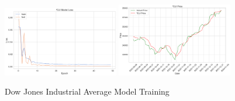 \documentclass{ledger}
\begin{document}
\begin{figure}[htbp]
    \centering
    \includegraphics[width=0.45\textwidth]{code/price-prediction/lstm/images/^dji_loss.png} %
    \hspace{0.05\textwidth} %
    \includegraphics[width=0.45\textwidth]{code/price-prediction/lstm/images/^dji_price.png} %
    \caption{Dow Jones Industrial Average Model Training}
    \label{fig:side_by_side}
\end{figure}

\thispagestyle{pagelast}

\end{document}
